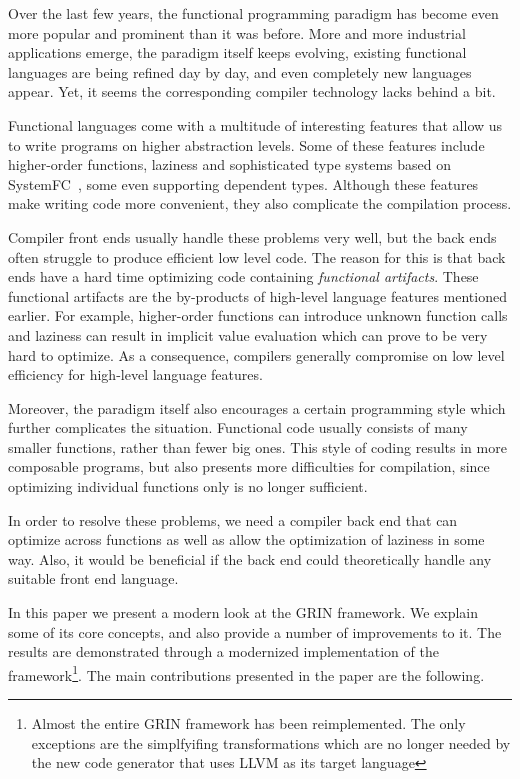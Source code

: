 \documentclass[main.tex]{subfiles}
\begin{document}
	
	Over the last few years, the functional programming paradigm has become even more popular and prominent than it was before. More and more industrial applications emerge, the paradigm itself keeps evolving, existing functional languages are being refined day by day, and even completely new languages appear. Yet, it seems the corresponding compiler technology lacks behind a bit.
	
	Functional languages come with a multitude of interesting features that allow us to write programs on higher abstraction levels. Some of these features include higher-order functions, laziness and sophisticated type systems based on SystemFC~\cite{systemfc}, some even supporting dependent types. Although these features make writing code more convenient, they also complicate the compilation process.
	
	Compiler front ends usually handle these problems very well, but the back ends often struggle to produce efficient low level code. The reason for this is that back ends have a hard time optimizing code containing \emph{functional artifacts}. These functional artifacts are the by-products of high-level language features mentioned earlier. For example, higher-order functions can introduce unknown function calls and laziness can result in implicit value evaluation which can prove to be very hard to optimize. As a consequence, compilers generally compromise on low level efficiency for high-level language features.
	
	Moreover, the paradigm itself also encourages a certain programming style which further complicates the situation. Functional code usually consists of many smaller functions, rather than fewer big ones. This style of coding results in more composable programs, but also presents more difficulties for compilation, since optimizing individual functions only is no longer sufficient. 
	
	In order to resolve these problems, we need a compiler back end that can optimize across functions as well as allow the optimization of laziness in some way. Also, it would be beneficial if the back end could theoretically handle any suitable front end language.
	
	In this paper we present a modern look at the GRIN framework. We explain some of its core concepts, and also provide a number of improvements to it. The results are demonstrated through a modernized implementation of the framework\footnote{Almost the entire GRIN framework has been reimplemented. The only exceptions are the simplfyifing transformations which are no longer needed by the new code generator that uses LLVM as its target language}. The main contributions presented in the paper are the following.
	
\end{document}
